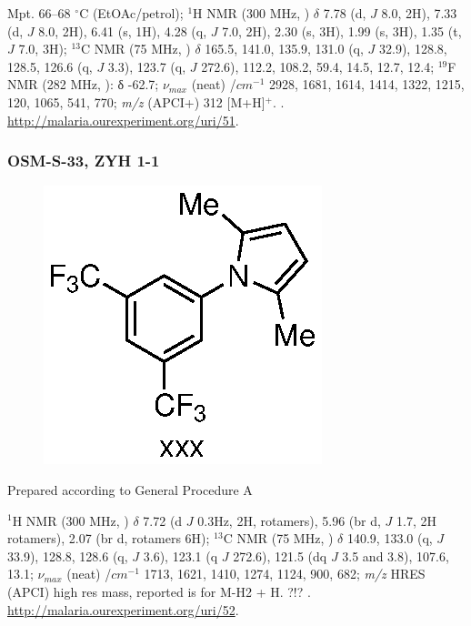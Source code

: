 \documentclass[12pt, a4paper,titlepage]{article}
\begin{document}
{%
Mpt. 66--68 $^\circ$C (EtOAc/petrol); 
$^1$H NMR (300 MHz, ) $\delta$  7.78 (d, $J$  8.0, 2H), 7.33 (d, $J$ 8.0, 2H), 6.41 (s, 1H), 4.28 (q, $J$ 7.0, 2H), 2.30 (s, 3H), 1.99 (s, 3H), 1.35 (t, $J$ 7.0, 3H); 
  $^{13}$C NMR (75 MHz, ) $\delta$ 165.5, 141.0, 135.9, 131.0 (q, $J$ 32.9), 128.8, 128.5, 126.6 (q, $J$ 3.3), 123.7 (q, $J$ 272.6), 112.2, 108.2, 59.4, 14.5, 12.7, 12.4; 
$^{19}$F NMR (282 MHz, ): δ -62.7;
 $\nu_{max}$ (neat) /$cm^{-1}$  2928, 1681, 1614, 1414, 1322, 1215, 120, 1065, 541, 770;
\emph{m/z} (APCI+) 312 [M+H]$^+$.
. 
\url{http://malaria.ourexperiment.org/uri/51}. 

\subsubsection*{OSM-S-33, ZYH 1-1}
\label{exp:ZYH1}
	\begin{figure}[H]
	\begin{center}
	\includegraphics{exp/ZYH1.eps}
	\end{center}
	\vspace{-25pt}	
	\end{figure}


Prepared according to General Procedure A

$^1$H NMR (300 MHz, ) $\delta$ 7.72 (d $J$ 0.3Hz, 2H, rotamers), 5.96 (br d, $J$ 1.7, 2H rotamers), 2.07 (br d, rotamers 6H); 
$^{13}$C NMR (75 MHz, ) $\delta$ 140.9, 133.0 (q, $J$ 33.9), 128.8, 128.6 (q, $J$ 3.6), 123.1 (q $J$ 272.6), 121.5 (dq $J$ 3.5 and 3.8), 107.6, 13.1;
 $\nu_{max}$ (neat) /$cm^{-1}$ 1713, 1621, 1410, 1274, 1124, 900, 682; 
\emph{m/z} HRES (APCI) high res mass, reported is for M-H2 + H. ?!?
. 
\url{http://malaria.ourexperiment.org/uri/52}. 

}
\end{document}
